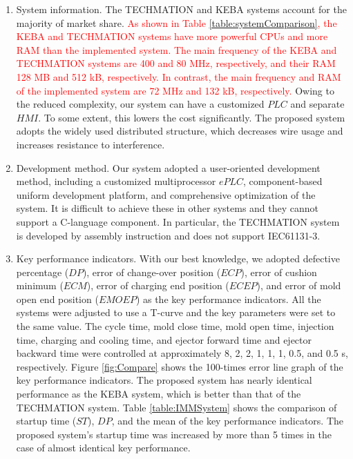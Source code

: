 \documentclass[journal,UTF8]{IEEEtran}
\begin{document}
	\begin{enumerate}
		\item System information. The TECHMATION and KEBA systems account for the majority of market share. \textcolor{red}{As shown in Table \ref{table:systemComparison}, the KEBA and TECHMATION systems have more powerful CPUs and more RAM than the implemented system. The main frequency of the KEBA and TECHMATION systems are 400 and 80 MHz, respectively, and their RAM 128 MB and 512 kB, respectively. In contrast, the main frequency and RAM of the implemented system are 72 MHz and 132 kB, respectively.} Owing to the reduced complexity, our system can have a customized $PLC$ and separate $HMI$. To some extent, this lowers the cost significantly. The proposed system adopts the widely used distributed structure, which decreases wire usage and increases resistance to interference.
		\item Development method. Our system adopted a user-oriented development method, including a customized multiprocessor $ePLC$, component-based uniform development platform, and comprehensive optimization of the system. It is difficult to achieve these in other systems and they cannot support a C-language component. In particular, the TECHMATION system is developed by assembly instruction and does not support IEC61131-3.
		\item Key performance indicators. With our best knowledge, we adopted defective percentage ($DP$), error of change-over position ($ECP$), error of cushion minimum ($ECM$), error of charging end position ($ECEP$), and error of mold open end position ($EMOEP$) as the key performance indicators. All the systems were adjusted to use a T-curve and the key parameters were set to the same value. The cycle time, mold close time, mold open time, injection time, charging and cooling time, and ejector forward time and ejector backward time were controlled at approximately 8, 2, 2, 1, 1, 1, 0.5, and 0.5 s, respectively. Figure \ref{fig:Compare} shows the 100-times error line graph of the key performance indicators. The proposed system has nearly identical performance as the KEBA system, which is better than that of the TECHMATION system. Table \ref{table:IMMSystem} shows the comparison of startup time ($ST$), $DP$, and the mean of the key performance indicators. The proposed system's startup time was increased by more than 5 times in the case of almost identical key performance.
	\end{enumerate}
	
\end{document}
